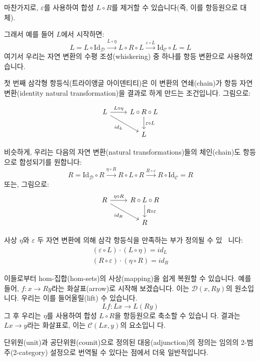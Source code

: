 \documentclass[DaoFP]{subfiles}
\begin{document}
마찬가지로, $\varepsilon$를 사용하여 합성 $L \circ R$를 제거할 수 있습니다(즉, 이를 항등원으로 대체).

그래서 예를 들어 $L$에서 시작하면:
\[ L = L \circ \text{Id}_{\mathcal{D}} \xrightarrow{L \circ \eta} L \circ R \circ L \xrightarrow{\varepsilon \circ L} \text{Id}_{\mathcal{C}} \circ L = L \]
여기서 우리는 자연 변환의 수평 조성(whiskering) 중 하나를 항등 변환으로 사용하였습니다.

첫 번째 삼각형 항등식(트라이앵글 아이덴티티)은 이 변환의 연쇄(chain)가 항등 자연 변환(identity natural transformation)을 결과로 하게 만드는 조건입니다. 그림으로:

\[
 \begin{tikzcd}
 L
 \arrow[r, "L \circ \eta"]
 \arrow[rd, "id_L"']
 & L \circ R \circ L
 \arrow[d, "\varepsilon \circ L"]
 \\
 & L
  \end{tikzcd}
\]

비슷하게, 우리는 다음의 자연 변환(natural transformations)들의 체인(chain)도 항등으로 합성되기를 원합니다:
\[ R = \text{Id}_{\mathcal{D}} \circ R \xrightarrow{\eta \circ R} R \circ L \circ R \xrightarrow{R \circ \varepsilon} R \circ \text{Id}_{\mathcal{C}} = R \]
또는, 그림으로:
\[
 \begin{tikzcd}
 R
 \arrow[r, "\eta \circ R"]
 \arrow[rd, "id_R"']
 & R \circ L \circ R
 \arrow[d, "R \circ \varepsilon"]
 \\
 & R
  \end{tikzcd}
\]

사상 $\eta$와 $\varepsilon$ 두 자연 변환에 의해 삼각 항등식을 만족하는 부가 정의될 수 있 ~니다:
\begin{align*}
(\varepsilon \circ L) \cdot (L \circ \eta) = id_L \\
(R \circ \varepsilon) \cdot (\eta \circ R) = id_R
\end{align*}

이들로부터 hom-집합(hom-sets)의 사상(mapping)을 쉽게 복원할 수 있습니다. 예를 들어, $f \colon x \to R y$라는 화살표(arrow)로 시작해 보겠습니다. 이는 $\mathcal{D}( x , R y)$의 원소입니다. 우리는 이를 들어올릴(lift) 수 있습니다.
\[L f \colon L x \to L (R y)\]
그 후 우리는 $\eta$를 사용하여 합성 $L \circ R$을 항등원으로 축소할 수 있습니 다. 결과는 $L x \to y$라는 화살표로, 이는 $\mathcal{C}(L x, y)$의 요소입니 다.


단위원(unit)과 공단위원(counit)으로 정의된 대응(adjunction)의 정의는 임의의 2-범주(2-category) 설정으로 번역될 수 있다는 점에서 더욱 일반적입니다.
\end{document}
